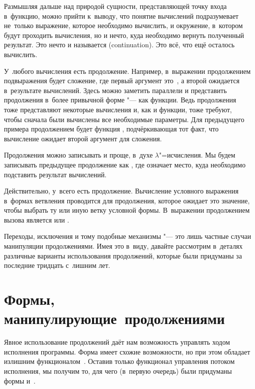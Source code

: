 Размышляя дальше над природой сущности, представляющей точку входа в~функцию,
можно прийти к~выводу, что понятие вычислений подразумевает не~только выражение,
которое необходимо вычислить, и окружение, в~котором будут проходить вычисления,
но и нечто, куда необходимо вернуть полученный результат. Это нечто и называется
 (continuation). Это всё, что ещё осталось вычислить.

У~любого вычисления есть продолжение. Например, в~выражении 
продолжением подвыражения  будет сложение, где первый аргумент
это~, а второй ожидается в~результате вычислений. Здесь можно заметить
параллели и представить продолжения в~более привычной форме "--- как функции.
Ведь продолжения тоже представляют некоторые вычисления и, как и функции, тоже
требуют, чтобы сначала были вычислены все необходимые параметры. Для предыдущего
примера продолжением  будет функция , подчёркивающая тот факт, что вычисление ожидает второй аргумент для
сложения.

Продолжения можно записывать и проще, в~духе $\lambda$"=исчисления. Мы будем
записывать предыдущее продолжение как , где \ic{[]} означает место,
куда необходимо подставить результат вычислений.

Действительно, у~всего есть продолжение. Вычисление условного выражения в~формах
ветвления проводится для продолжения, которое ожидает это значение, чтобы
выбрать ту или иную ветку условной формы. В~выражении 
продолжением вызова  является 
или .

Переходы, исключения и тому подобные механизмы "--- это лишь частные случаи
манипуляции продолжениями. Имея это в~виду, давайте рассмотрим в~деталях
различные варианты использования продолжений, которые были придуманы за
последние тридцать с~лишним лет.


\section{Формы, манипулирующие~продолжениями}\label{escape/sect:handling}

Явное использование продолжений даёт нам возможность управлять ходом исполнения
программы. Форма  имеет схожие возможности, но при этом обладает
излишним функционалом~. Оставив только функционал управления потоком
исполнения, мы получим то, для чего (в~первую очередь) были придуманы формы
 и~.


